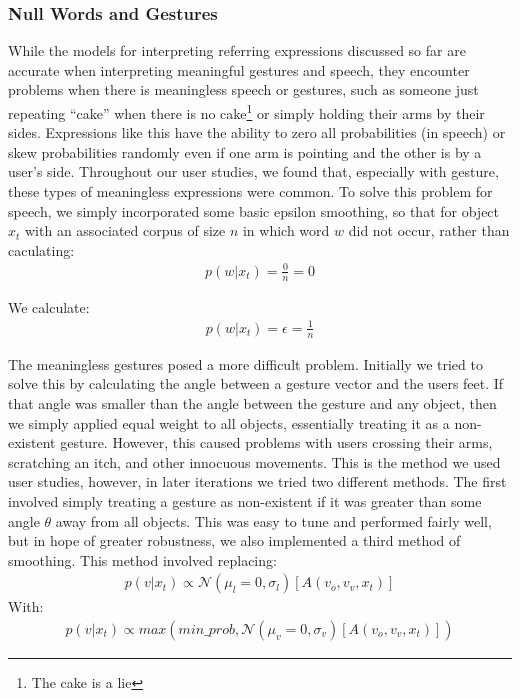 \documentclass[a4paper, 11pt]{article} %
\begin{document}
\subsubsection{Null Words and Gestures}
While the models for interpreting referring expressions discussed so far are accurate when interpreting meaningful gestures and speech, they encounter problems when there is meaningless speech or gestures, such as someone just repeating ``cake'' when there is no cake\footnote{The cake is a lie} or simply holding their arms by their sides. Expressions like this have the ability to zero all probabilities (in speech) or skew probabilities randomly even if one arm is pointing and the other is by a user's side. Throughout our user studies, we found that, especially with gesture, these types of meaningless expressions were common. To solve this problem for speech, we simply incorporated some basic epsilon smoothing, so that for object $x_t$ with an associated corpus of size $n$ in which word $w$ did not occur, rather than caculating:
\begin{align}
p(w | x_t) = \frac{0}{n} = 0
\end{align}

We calculate:
\begin{align}
p(w | x_t) = \epsilon = \frac{1}{n}
\end{align}

The meaningless gestures posed a more difficult problem. Initially we tried to solve this by calculating the angle between a gesture vector and the users feet. If that angle was smaller than the angle between the gesture and any object, then we simply applied equal weight to all objects, essentially treating it as a non-existent gesture. However, this caused problems with users crossing their arms, scratching an itch, and other innocuous movements. This is the method we used user studies, however, in later iterations we tried two different methods. The first involved simply treating a gesture as non-existent if it was greater than some angle $\theta$ away from all objects. This was easy to tune and performed fairly well, but in hope of greater robustness, we also implemented a third method of smoothing. This method involved replacing:
\begin{align}
p(v | x_t) \propto \mathcal{N}(\mu_l=0, \sigma_l)[A(v_o, v_v, x_t)]
\end{align}
With:
\begin{align}
p(v | x_t) \propto max(min\_prob, \mathcal{N}(\mu_v=0, \sigma_v)[A(v_o, v_v, x_t)])
\end{align}
\end{document}
